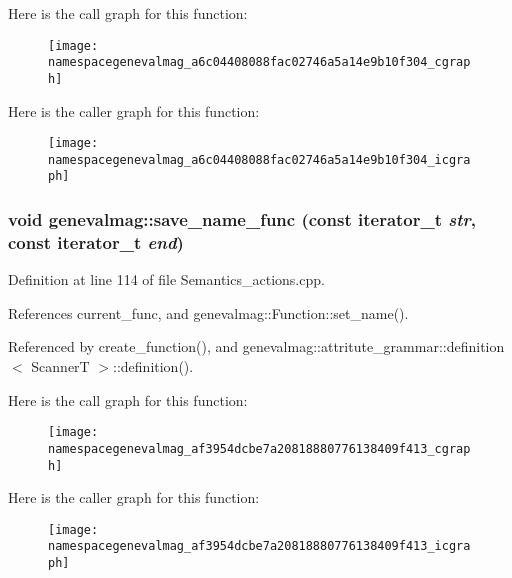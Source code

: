 Here is the call graph for this function:\nopagebreak
\begin{figure}[H]
\begin{center}
\leavevmode
\texttt{[image: namespacegenevalmag\_a6c04408088fac02746a5a14e9b10f304\_cgraph]}
\end{center}
\end{figure}




Here is the caller graph for this function:\nopagebreak
\begin{figure}[H]
\begin{center}
\leavevmode
\texttt{[image: namespacegenevalmag\_a6c04408088fac02746a5a14e9b10f304\_icgraph]}
\end{center}
\end{figure}


\hypertarget{namespacegenevalmag_af3954dcbe7a20818880776138409f413}{
\subsubsection[{save\_\-name\_\-func}]{\setlength{\rightskip}{0pt plus 5cm}void genevalmag::save\_\-name\_\-func (const iterator\_\-t {\em str}, \/  const iterator\_\-t {\em end})}}
\label{namespacegenevalmag_af3954dcbe7a20818880776138409f413}


Definition at line 114 of file Semantics\_\-actions.cpp.



References current\_\-func, and genevalmag::Function::set\_\-name().



Referenced by create\_\-function(), and genevalmag::attritute\_\-grammar::definition$<$ ScannerT $>$::definition().



Here is the call graph for this function:\nopagebreak
\begin{figure}[H]
\begin{center}
\leavevmode
\texttt{[image: namespacegenevalmag\_af3954dcbe7a20818880776138409f413\_cgraph]}
\end{center}
\end{figure}




Here is the caller graph for this function:\nopagebreak
\begin{figure}[H]
\begin{center}
\leavevmode
\texttt{[image: namespacegenevalmag\_af3954dcbe7a20818880776138409f413\_icgraph]}
\end{center}
\end{figure}


